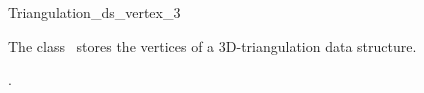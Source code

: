 

\begin{ccRefClass}{Triangulation_ds_vertex_3}  %


\ccDefinition
  
The class \ccRefName\ stores the vertices of a 3D-triangulation data structure. 


\ccIsModel


\ccSeeAlso

.



\end{ccRefClass}


